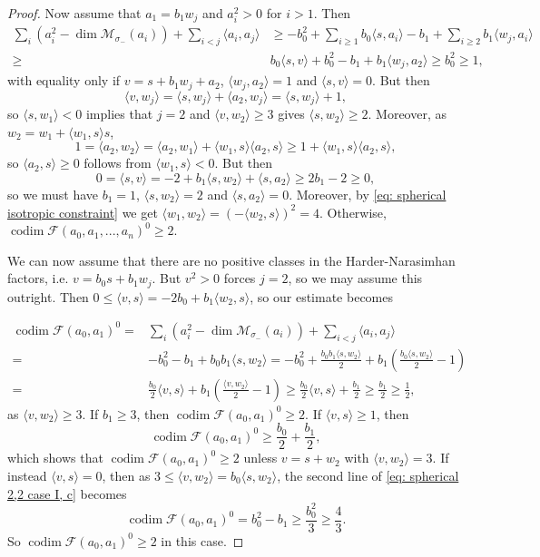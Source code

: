 \documentclass[leqno,11pt]{amsart}
\def\codim{\mathop{\mathrm{codim}}\nolimits}
\def\dim{\mathop{\mathrm{dim}}\nolimits}
\theoremstyle{definition}
\def\FF{\ensuremath{\mathcal F}}
\def\MM{\ensuremath{\mathcal M}}
\begin{document}
\begin{proof}
Now assume that $a_1=b_1 w_j$ and $a_i^2>0$ for $i>1$.  Then 
 \begin{equation}
\begin{split}
 \sum_i (a_i^2-\dim \MM_{\sigma_-}(a_i))+\sum_{i<j}\langle a_i,a_j \rangle
&\geq  -b_0^2+\sum_{i \geq 1}b_0 \langle s,a_i \rangle
-b_1+\sum_{i \geq 2} b_1 \langle w_j,a_i \rangle\\
\geq & b_0 \langle s,v \rangle+b_0^2
-b_1+b_1 \langle w_j,a_2 \rangle 
\geq  b_0^2 \geq 1,
\end{split}
\end{equation}
with equality only if $v=s+b_1w_j+a_2$, $\langle w_j,a_2\rangle=1$ and $\langle s,v\rangle=0$.  But then $$\langle v,w_j\rangle=\langle s,w_j\rangle+\langle a_2,w_j\rangle=\langle s,w_j\rangle+1,$$ so $\langle s,w_1\rangle<0$ implies that $j=2$ and $\langle v,w_2\rangle\geq 3$ gives $\langle s,w_2\rangle\geq 2$.  Moreover, as $w_2=w_1+\langle w_1,s\rangle s$, $$1=\langle a_2,w_2\rangle=\langle a_2,w_1\rangle+\langle w_1,s\rangle\langle a_2,s\rangle\geq 1+\langle w_1,s\rangle\langle a_2,s\rangle,$$ so $\langle a_2,s\rangle\geq 0$ follows from $\langle w_1,s\rangle<0$.  But then $$0=\langle s,v\rangle=-2+b_1\langle s,w_2\rangle+\langle s,a_2\rangle\geq 2b_1-2\geq 0,$$ so we must have $b_1=1$, $\langle s,w_2\rangle=2$ and $\langle s,a_2\rangle=0$.  Moreover, by \eqref{eq: spherical isotropic constraint} we get $\langle w_1,w_2\rangle=(-\langle w_2,s\rangle)^2=4$.  Otherwise, $\codim\FF(a_0,a_1,...,a_n)^0\geq 2$.

We can now assume that there are no positive classes in the Harder-Narasimhan factors, i.e. $v=b_0 s+b_1 w_j$.  But $v^2>0$ forces $j=2$, so we may assume this outright.  Then $0 \leq \langle v,s \rangle=-2b_0+b_1 \langle w_2,s \rangle$, so our estimate becomes 

 \begin{equation}\label{eq: spherical 2,2 case I, c}
\begin{split}
\codim\FF(a_0,a_1)^0=&\sum_i (a_i^2-\dim \MM_{\sigma_-}(a_i))+\sum_{i<j}\langle a_i,a_j \rangle\\
= & -b_0^2-b_1+b_0b_1\langle s,w_2\rangle=-b_0^2+\frac{b_0b_1\langle s,w_2\rangle}{2}+b_1\left(\frac{b_0\langle s,w_2\rangle}{2}-1\right)\\
= & \frac{b_0}{2}\langle v,s\rangle+b_1\left(\frac{\langle v,w_2\rangle}{2}-1\right)\geq \frac{b_0}{2}\langle v,s\rangle+\frac{b_1}{2}\geq \frac{b_1}{2}\geq\frac{1}{2},
\end{split}
\end{equation}
as $\langle v,w_2\rangle\geq 3$.  If $b_1\geq 3$, then $\codim\FF(a_0,a_1)^0\geq 2$.  If $\langle v,s\rangle\geq 1$, then $$\codim\FF(a_0,a_1)^0\geq \frac{b_0}{2}+\frac{b_1}{2},$$ which shows that $\codim\FF(a_0,a_1)^0\geq 2$ unless $v=s+w_2$ with $\langle v,w_2\rangle=3$.  If instead $\langle v,s\rangle=0$, then as $3\leq\langle v,w_2\rangle=b_0\langle s,w_2\rangle$, the second line of \eqref{eq: spherical 2,2 case I, c} becomes $$\codim\FF(a_0,a_1)^0=b_0^2-b_1\geq\frac{b_0^2}{3}\geq\frac{4}{3}.$$    So $\codim\FF(a_0,a_1)^0\geq 2$ in this case. 


\end{proof}
\end{document}
